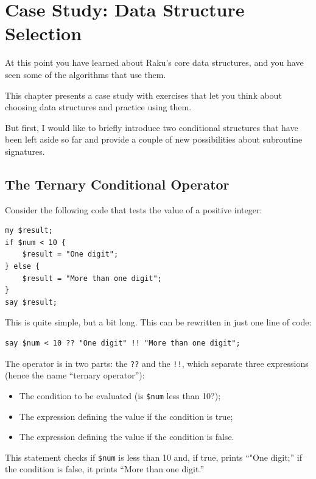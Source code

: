 
\chapter{Case Study: Data Structure Selection}
\label{data_struct_sel}

At this point you have learned about Raku's core data structures,
and you have seen some of the algorithms that use them.

This chapter presents a case study with exercises that let
you think about choosing data structures and practice using them.

But first, I would like to briefly introduce two conditional 
structures that have been left aside so far and provide 
a couple of new possibilities about subroutine signatures. 

\section{The Ternary Conditional Operator}
\label{ternary operator}

Consider the following code that tests the value of a positive 
integer:

\begin{verbatim}
my $result;
if $num < 10 {
    $result = "One digit";
} else {
    $result = "More than one digit";
}
say $result;
\end{verbatim}

This is quite simple, but a bit long. This can be rewritten 
in just one line of code:

\begin{verbatim}
say $num < 10 ?? "One digit" !! "More than one digit";
\end{verbatim}

The operator is in two parts: the {\tt ??} and the {\tt !!}, which 
separate three expressions (hence the name ``ternary operator''): 
\begin{itemize}
\item The condition to be evaluated (is \verb'$num' less than 10?);
\item The expression defining the value if the condition is true;
\item The expression defining the value if the condition is false.
\end{itemize}

This statement checks if \verb'$num' is less than 10 and, if 
true, prints ``"One digit;'' if the 
condition is false, it prints ``More than one digit.''


